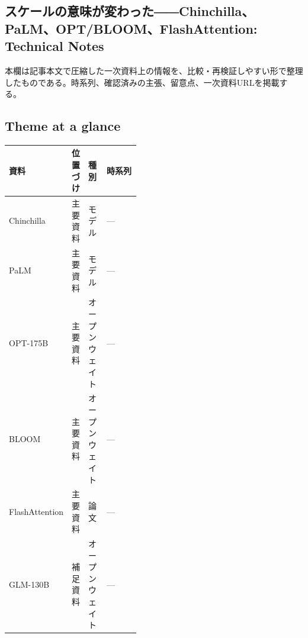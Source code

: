 \subsection*{スケールの意味が変わった――Chinchilla、PaLM、OPT/BLOOM、FlashAttention: Technical Notes}
本欄は記事本文で圧縮した一次資料上の情報を、比較・再検証しやすい形で整理したものである。時系列、確認済みの主張、留意点、一次資料URLを掲載する。
\smallskip
{}\par
\medskip
\subsection*{Theme at a glance}
\begin{center}
\footnotesize
\begin{tabularx}{\linewidth}{@{}p{0.20\linewidth}p{0.10\linewidth}p{0.14\linewidth}X@{}}
\toprule
資料 & 位置づけ & 種別 & 時系列 \\
\midrule
Chinchilla & 主要資料 & モデル & — \\
PaLM & 主要資料 & モデル & — \\
OPT-175B & 主要資料 & オープンウェイト & — \\
BLOOM & 主要資料 & オープンウェイト & — \\
FlashAttention & 主要資料 & 論文 & — \\
GLM-130B & 補足資料 & オープンウェイト & — \\
\bottomrule
\end{tabularx}
\end{center}
\normalsize

